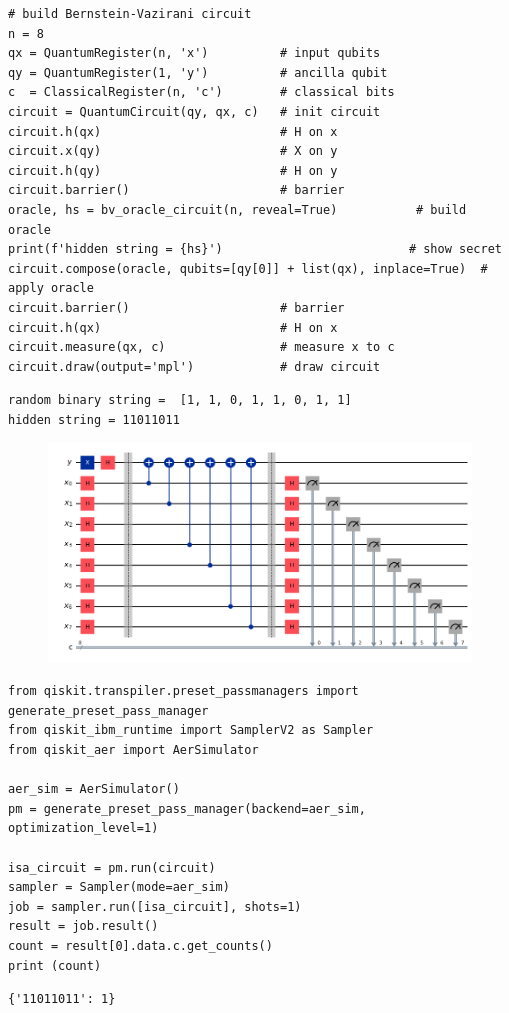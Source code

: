 \begin{lstlisting}[style=python]
# build Bernstein-Vazirani circuit
n = 8
qx = QuantumRegister(n, 'x')          # input qubits
qy = QuantumRegister(1, 'y')          # ancilla qubit
c  = ClassicalRegister(n, 'c')        # classical bits
circuit = QuantumCircuit(qy, qx, c)   # init circuit
circuit.h(qx)                         # H on x
circuit.x(qy)                         # X on y
circuit.h(qy)                         # H on y
circuit.barrier()                     # barrier
oracle, hs = bv_oracle_circuit(n, reveal=True)           # build oracle
print(f'hidden string = {hs}')                          # show secret
circuit.compose(oracle, qubits=[qy[0]] + list(qx), inplace=True)  # apply oracle
circuit.barrier()                     # barrier
circuit.h(qx)                         # H on x
circuit.measure(qx, c)                # measure x to c
circuit.draw(output='mpl')            # draw circuit
\end{lstlisting}
\begin{lstlisting}
random binary string =  [1, 1, 0, 1, 1, 0, 1, 1]
hidden string = 11011011
\end{lstlisting}

\begin{figure}[h!]\centering
	\includegraphics[scale=.5]{images/lab05_2}
\end{figure}

\begin{lstlisting}[style=python]
from qiskit.transpiler.preset_passmanagers import generate_preset_pass_manager
from qiskit_ibm_runtime import SamplerV2 as Sampler
from qiskit_aer import AerSimulator

aer_sim = AerSimulator()
pm = generate_preset_pass_manager(backend=aer_sim, optimization_level=1)

isa_circuit = pm.run(circuit)
sampler = Sampler(mode=aer_sim)
job = sampler.run([isa_circuit], shots=1)
result = job.result()
count = result[0].data.c.get_counts()
print (count)
\end{lstlisting}
\begin{lstlisting}
{'11011011': 1}
\end{lstlisting}

